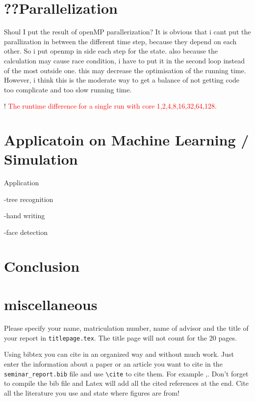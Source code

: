 \documentclass[twoside,a4paper,article]{combine}
\begin{document}
\section{??Parallelization}
	\textcolor{light-gray}{Shoul I put the result of openMP parallerization?}
	It is obvious that i cant put the parallization in between the different time step, because they depend on each other. So i put openmp in side each step for the state. also because the calculation may cause race condition, i have to put it in the second loop instead of the most outside one. this may decrease the optimisation of the running time. However, i think this is the moderate way to get a balance of not getting code too complicate and too slow running time.
	
	! \textcolor{red}{The runtime difference for a single run with core 1,2,4,8,16,32,64,128.}

	
\section{Applicatoin on Machine Learning / Simulation}
	
	\cite{Adachi2015}
	\cite{Benedetti2016}
	\cite{Boyda2017}
	\cite{OMalley2017}
	\cite{Potok2017}
	
	
	Application
	 
	-tree recognition
	
	-hand writing
	
	-face detection
	


\section{Conclusion}
\section{miscellaneous}




Please specify your name, matriculation number, name of advisor and the title of your report in \linebreak
\verb+titlepage.tex+.
The title page will not count for the 20 pages.

Using bibtex you can cite in an organized way and without much work.
Just enter the information about a paper or an article you want to cite in the \verb+seminar_report.bib+ file and use \verb+\cite+ to cite them. For example \cite{Author08CVPR},\cite{Author04IJCV}.
Don't forget to compile the bib file and Latex will add all the cited references at the end.
Cite all the literature you use and state where figures are from!
\end{document}
